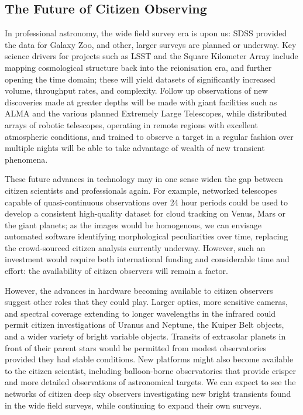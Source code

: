 \documentclass{ar2e}
\begin{document}
\subsection{The Future of Citizen Observing}

In professional astronomy, the wide field survey era is upon us: SDSS provided
the data for Galaxy Zoo, and other, larger surveys are planned or underway. Key
science drivers for projects such as LSST and the Square Kilometer Array include
mapping cosmological structure back into the reionisation era, and  further
opening the time domain; these will yield datasets of significantly increased
volume, throughput rates, and complexity.  Follow up observations of new
discoveries made at greater depths will be made with giant facilities such as
ALMA and the various planned Extremely Large Telescopes, while distributed
arrays of robotic telescopes, operating in remote regions with excellent
atmospheric conditions, and trained to observe a target in a regular fashion
over multiple nights will be able to take advantage of wealth of new transient
phenomena. 

These future advances in technology may in one sense widen the gap between
citizen scientists and professionals again. For example, networked telescopes
capable of quasi-continuous observations over 24 hour periods could be used to
develop a consistent high-quality dataset for cloud tracking on Venus, Mars or
the giant planets; as the images would be homogenous, we can envisage automated
software identifying morphological peculiarities over time, replacing the
crowd-sourced citizen analysis currently underway.  However, such an investment
would require both international funding and considerable time and effort: the
availability of citizen observers will remain a factor.

However, the advances in hardware becoming available to citizen observers
suggest other roles that they could play. Larger optics, more sensitive
cameras, and spectral coverage extending to longer wavelengths in the infrared
could permit citizen investigations of Uranus and Neptune, the Kuiper Belt
objects, and a wider variety of bright variable objects.  Transits of
extrasolar planets in front of their parent stars would be permitted from
modest observatories provided they had stable conditions.  New platforms might
also become available to the citizen scientist, including balloon-borne
observatories that provide crisper and more detailed observations of
astronomical targets. We can expect to see the networks of citizen deep sky
observers investigating new bright transients found in the wide field
surveys, while continuing to expand their own surveys.
\end{document}
